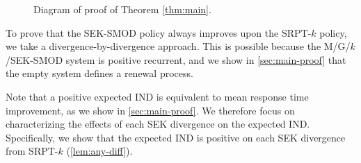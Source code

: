 \documentclass[acmsmall]{acmart}
\begin{document}
\begin{figure}
\caption{Diagram of proof of Theorem \ref{thm:main}.}
\label{diagram:thm-proof}
\end{figure}


To prove that the SEK-SMOD policy always improves upon the SRPT-$k$ policy, we take a divergence-by-divergence approach. This is possible because the M/G/$k$/SEK-SMOD system is positive recurrent, and we show in \cref{sec:main-proof} that the empty system defines a renewal process. 

Note that a positive expected IND is equivalent to mean response time improvement, as we show in \cref{sec:main-proof}. We therefore focus on characterizing the effects of each SEK divergence on the expected IND. Specifically, we show that the expected IND is positive on each SEK divergence from SRPT-$k$ (\cref{lem:any-diff}).
\end{document}
